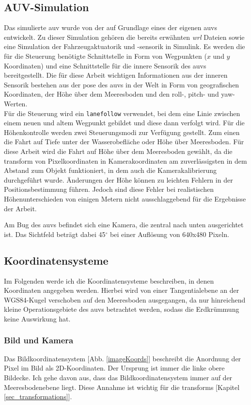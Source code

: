 \subsection{AUV-Simulation}
\label{sec_auvSimGrundlage}
Das simulierte \gls{auv} wurde von der \atlas auf Grundlage eines der eigenen \gls{auv}s entwickelt. Zu dieser Simulation gehören die bereits erwähnten \textit{wrl} Dateien sowie eine Simulation der Fahrzeugaktuatorik und -sensorik in \matlab Simulink. Es werden die für die Steuerung benötigte Schnittstelle in Form von Wegpunkten ($x$ und $y$ Koordinaten) und eine Schnittstelle für die innere Sensorik des \gls{auv}s bereitgestellt. Die für diese Arbeit wichtigen Informationen aus der inneren Sensorik bestehen aus der \gls{pose} des \gls{auv}s in der Welt in Form von geografischen Koordinaten, der Höhe über dem Meeresboden und den \gls{roll}-, \gls{pitch}- und \gls{yaw}-Werten.\\
Für die Steuerung wird ein \texttt{\gls{lanefollow}} verwendet, bei dem eine Linie zwischen einem neuen und altem Wegpunkt gebildet und diese dann verfolgt wird. Für die Höhenkontrolle werden zwei Steuerungsmodi zur Verfügung gestellt. Zum einen die Fahrt auf Tiefe unter der Wasserobefläche oder Höhe über Meeresboden. Für diese Arbeit wird die Fahrt auf Höhe über dem Meeresboden gewählt, da die \gls{transform} von Pixelkoordinaten in Kamerakoordinaten am zuverlässigsten in dem Abstand zum Objekt funktioniert, in dem auch die Kamerakalibrierung durchgeführt wurde. Änderungen der Höhe können zu leichten Fehlern in der Positionsbestimmung führen. Jedoch sind diese Fehler bei realistischen Höhenunterschieden von einigen Metern nicht ausschlaggebend für die Ergebnisse der Arbeit.

Am Bug des \gls{auv}s befindet sich eine Kamera, die zentral nach unten ausgerichtet ist. Das Sichtfeld beträgt dabei 45$^\circ$ bei einer Auflösung von 640x480 Pixeln.
\subsection{Koordinatensysteme}
\label{sec_coordsystems}
Im Folgenden werde ich die Koordinatensysteme beschreiben, in denen Koordinaten angegeben werden. Hierbei wird von einer Tangentialebene an der WGS84-Kugel verschoben auf den Meeresboden ausgegangen, da nur hinreichend kleine Operationsgebiete des \gls{auv}s betrachtet werden, sodass die Erdkrümmung keine Auswirkung hat.
\subsubsection{Bild und Kamera}
\label{sec_img_cam_coords}
Das Bildkoordinatensystem [Abb. \ref{imageKoords}] beschreibt die Anordnung der Pixel im Bild als 2D-Koordinaten. Der Ursprung ist immer die linke obere Bildecke. Ich gehe davon aus, dass das Bildkoordinatensystem immer auf der Meeresbodenebene liegt. Diese Annahme ist wichtig für die \glspl{transform} [Kapitel \ref{sec_transformations}].

